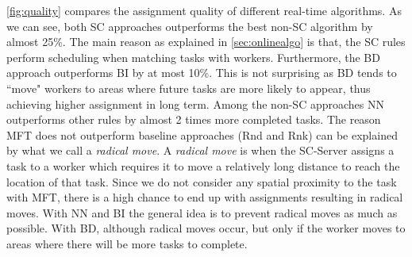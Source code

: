 \cref{fig:quality} compares the assignment quality of different real-time algorithms. As we can see, both SC approaches outperforms the best non-SC algorithm by almost 25\%. The main reason as explained in \cref{sec:onlinealgo} is that, the SC rules perform scheduling when matching tasks with workers. Furthermore, the BD approach outperforms BI by at most 10\%. This is not surprising as BD tends to ``move" workers to areas where future tasks are more likely to appear, thus achieving higher assignment in long term. Among the non-SC approaches NN outperforms other rules by almost 2 times more completed tasks. The reason MFT does not outperform baseline approaches (Rnd and Rnk) can be explained by what we call a \emph{radical move}. A \emph{radical move} is when the SC-Server assigns a task to a worker which requires it to move a relatively long distance to reach the location of that task. Since we do not consider any spatial proximity to the task with MFT, there is a high chance to end up with assignments resulting in radical moves. With NN and BI the general idea is to prevent radical moves as much as possible. With BD, although radical moves occur, but only if the worker moves to areas where there will be more tasks to complete. 

